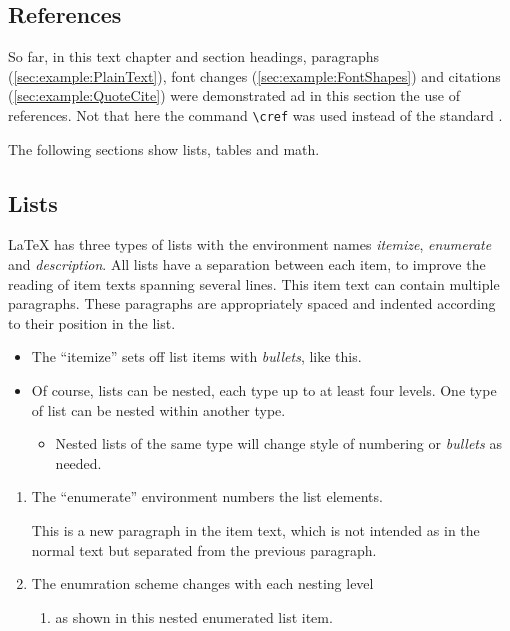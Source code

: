 \subsection{References}
\label{sec:example:references}

So far, in this text chapter and section headings, paragraphs (\cref{sec:example:PlainText}), font changes (\cref{sec:example:FontShapes}) and citations (\cref{sec:example:QuoteCite}) were demonstrated ad in this section the use of references. Not that here the command \texttt{\textbackslash{}cref} was used instead of the standard .

The following sections show lists, tables and math.

\subsection{Lists}
\label{sec:example:lists}

LaTeX has three types of lists with the environment names \emph{itemize}, \emph{enumerate} and \emph{description}. All lists have a separation between each item, to improve the reading of item texts spanning several lines. 
This item text can contain multiple paragraphs. These paragraphs are appropriately spaced and indented according to their position in the list.

\begin{itemize}
\item 
The \enquote{itemize} sets off list items with \emph{bullets}, like this.
%
\item Of course, lists can be nested, each type up to at least four levels.
One type of list can be nested within another type.
%
  \begin{itemize}
  \item Nested lists of the same type will change style of numbering 
  or \emph{bullets} as needed.
  \end{itemize}
\end{itemize}

\begin{enumerate}
\item The \enquote{enumerate} environment numbers the list elements.

This is a new paragraph in the item text, which is not intended as in the 
normal text but separated from the previous paragraph.
%
\item The enumration scheme changes with each nesting level
  \begin{enumerate}
  \item as shown in this nested enumerated list item.
  \end{enumerate}
\end{enumerate}  

